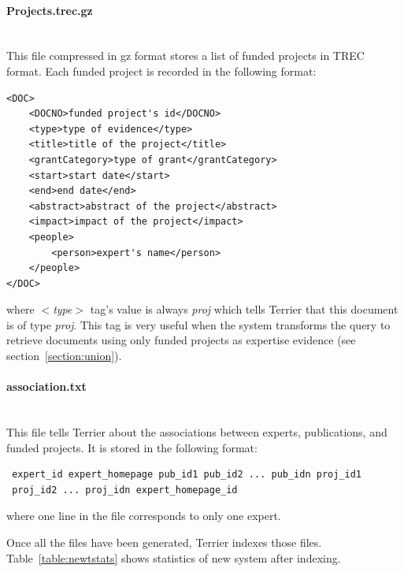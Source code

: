 \paragraph{Projects.trec.gz} \hspace{0pt} \\
This file compressed in gz format stores a list of funded projects in TREC format. Each funded project is recorded in the following format:
\begin{verbatim}
<DOC>
	<DOCNO>funded project's id</DOCNO>
	<type>type of evidence</type>
	<title>title of the project</title>
	<grantCategory>type of grant</grantCategory>
	<start>start date</start>
	<end>end date</end>
	<abstract>abstract of the project</abstract>
	<impact>impact of the project</impact>
	<people>
		<person>expert's name</person>
	</people>
</DOC>

\end{verbatim}
where \textit{$<$type$>$} tag's value is always \textit{proj} which tells Terrier that this document is of type \textit{proj}. This tag is very useful when 
the system transforms the query to retrieve documents using only funded projects as expertise evidence (see section~\ref{section:union}).

\paragraph{association.txt} \hspace{0pt} \\
This file tells Terrier about the associations between experts, publications, and funded projects. It is stored in the following format:
\begin{verbatim}
 expert_id expert_homepage pub_id1 pub_id2 ... pub_idn proj_id1 
 proj_id2 ... proj_idn expert_homepage_id
\end{verbatim}
where one line in the file corresponds to only one expert.

Once all the files have been generated, Terrier indexes those files. Table~\ref{table:newtstats} shows statistics of new system after indexing.

\begin{table}
\centering
{}
\caption{Statistics of New System After Indexing Process} \label{table:newtstats}
\end{table}

